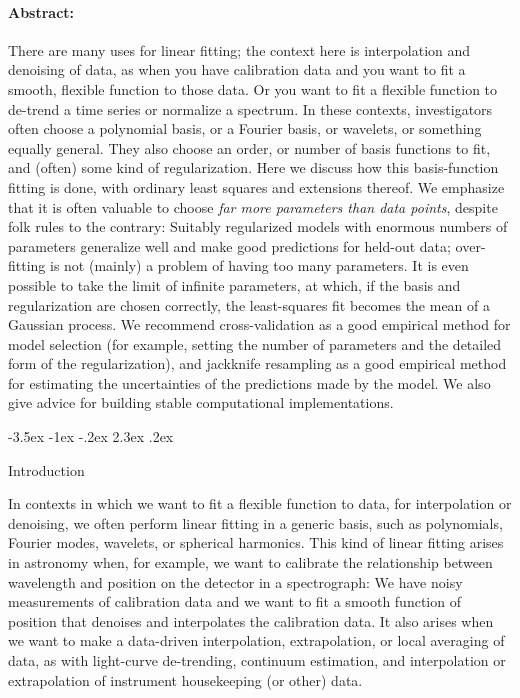 \documentclass[12pt,letterpaper]{article}
\makeatletter
\renewcommand\section{\@startsection {section}{1}{\z@}%
  {-3.5ex \@plus -1ex \@minus -.2ex}%
  {2.3ex \@plus.2ex}%
  {\raggedright\normalfont\Large\bfseries}}
\makeatother
\begin{document}
\paragraph{Abstract:} There are many uses for linear fitting; the context here is interpolation and denoising of data, as when you have calibration data and you want to fit a smooth, flexible function to those data.
Or you want to fit a flexible function to de-trend a time series or normalize a spectrum.
In these contexts, investigators often choose a polynomial basis, or a Fourier basis, or wavelets, or something equally general.
They also choose an order, or number of basis functions to fit, and (often) some kind of regularization.
Here we discuss how this basis-function fitting is done, with ordinary least squares and extensions thereof.
We emphasize that it is often valuable to choose \emph{far more parameters than data points}, despite folk rules to the contrary:
Suitably regularized models with enormous numbers of parameters generalize well and make good predictions for held-out data; over-fitting is not (mainly) a problem of having too many parameters.
It is even possible to take the limit of infinite parameters, at which, if the basis and regularization are chosen correctly, the least-squares fit becomes the mean of a Gaussian process.
We recommend cross-validation as a good empirical method for model selection (for example, setting the number of parameters and the detailed form of the regularization),
and jackknife resampling as a good empirical method for estimating the uncertainties of the predictions made by the model.
We also give advice for building stable computational implementations.

\section{Introduction}

In contexts in which we want to fit a flexible function to data, for interpolation or denoising, we often perform linear fitting in a generic basis, such as polynomials, Fourier modes, wavelets, or spherical harmonics.
This kind of linear fitting arises in astronomy when, for example, we want to calibrate the relationship between wavelength and position on the detector in a spectrograph:
We have noisy measurements of calibration data and we want to fit a smooth function of position that denoises and interpolates the calibration data.
It also arises when we want to make a data-driven interpolation, extrapolation, or local averaging of data, as with light-curve de-trending, continuum estimation, and interpolation or extrapolation of instrument housekeeping (or other) data.
\end{document}
